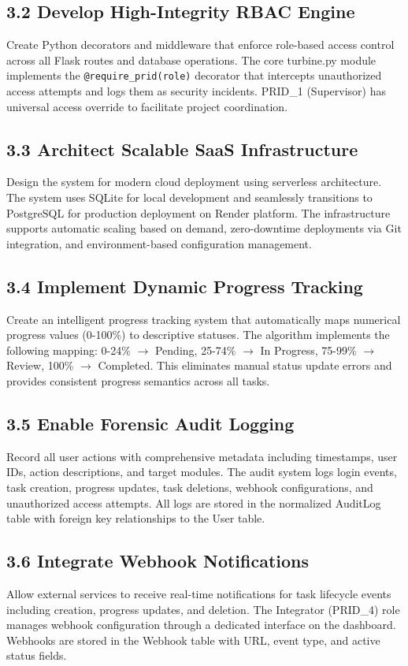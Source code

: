 ﻿\documentclass[12pt]{article}
\begin{document}
\subsection*{3.2 Develop High-Integrity RBAC Engine}
Create Python decorators and middleware that enforce role-based access control across all Flask routes and database operations. The core turbine.py module implements the \texttt{@require\_prid(role)} decorator that intercepts unauthorized access attempts and logs them as security incidents. PRID\_1 (Supervisor) has universal access override to facilitate project coordination.

\subsection*{3.3 Architect Scalable SaaS Infrastructure}
Design the system for modern cloud deployment using serverless architecture. The system uses SQLite for local development and seamlessly transitions to PostgreSQL for production deployment on Render platform. The infrastructure supports automatic scaling based on demand, zero-downtime deployments via Git integration, and environment-based configuration management.

\subsection*{3.4 Implement Dynamic Progress Tracking}
Create an intelligent progress tracking system that automatically maps numerical progress values (0-100\%) to descriptive statuses. The algorithm implements the following mapping: 0-24\% $\rightarrow$ Pending, 25-74\% $\rightarrow$ In Progress, 75-99\% $\rightarrow$ Review, 100\% $\rightarrow$ Completed. This eliminates manual status update errors and provides consistent progress semantics across all tasks.

\subsection*{3.5 Enable Forensic Audit Logging}
Record all user actions with comprehensive metadata including timestamps, user IDs, action descriptions, and target modules. The audit system logs login events, task creation, progress updates, task deletions, webhook configurations, and unauthorized access attempts. All logs are stored in the normalized AuditLog table with foreign key relationships to the User table.

\subsection*{3.6 Integrate Webhook Notifications}
Allow external services to receive real-time notifications for task lifecycle events including creation, progress updates, and deletion. The Integrator (PRID\_4) role manages webhook configuration through a dedicated interface on the dashboard. Webhooks are stored in the Webhook table with URL, event type, and active status fields.
\newpage
\end{document}
